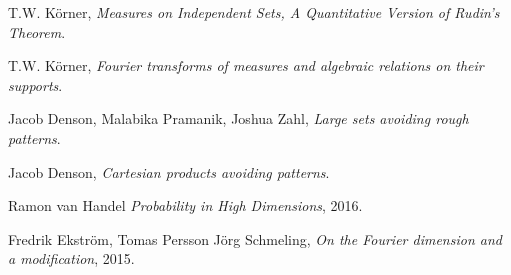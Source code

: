\documentclass[12pt,reqno]{article}
\numberwithin{equation}{section}
\begin{document}
\begin{thebibliography}{9}

    T.W. K\"{o}rner,
    \textit{Measures on Independent Sets, A Quantitative Version of Rudin's Theorem}.

    T.W. K\"{o}rner,
    \textit{Fourier transforms of measures and algebraic relations on their supports}.

    Jacob Denson, Malabika Pramanik, Joshua Zahl,
    \textit{Large sets avoiding rough patterns}.

    Jacob Denson,
    \textit{Cartesian products avoiding patterns}.


    Ramon van Handel
    \textit{Probability in High Dimensions},
    2016.

    Fredrik Ekstr\"{o}m, Tomas Persson J\"{o}rg Schmeling,
    \textit{On the Fourier dimension and a modification},
    2015.

\end{thebibliography}
\end{document}
